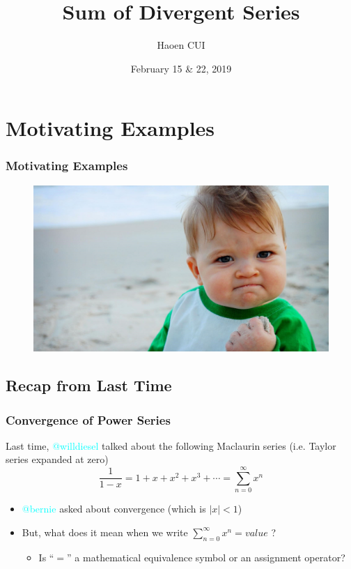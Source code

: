 \documentclass{beamer}
\title[Sum of Divergent Series]{Sum of Divergent Series} %
\author{Haoen CUI} %
\institute[Uptake] %
{
Uptake Math Club Lightning Talk
}
\date{February 15 \& 22, 2019}
\begin{document}
\begin{frame}
\titlepage %
\end{frame}


\section{Motivating Examples} 

\begin{frame}
\frametitle{Motivating Examples} 
\begin{figure}
\includegraphics[width=\linewidth]{success_kid.jpg}
\end{figure}
\end{frame}


\subsection{Recap from Last Time} 

\begin{frame}
\frametitle{Convergence of Power Series}

Last time, \textcolor{cyan}{@willdiesel} talked about the following Maclaurin series (i.e. Taylor series expanded at zero)
$$ \frac{1}{1-x} = 1 + x + x^2 + x^3 + \cdots = \sum_{n=0}^{\infty} x^n $$

\begin{itemize}
    \item \textcolor{cyan}{@bernie} asked about \alert{convergence} (which is $ |x| < 1 $) 
    \item But, what does it mean when we write $ \sum_{n=0}^{\infty} x^n = \textit{value} $ ?
    \begin{itemize}
        \item Is ``$=$'' a mathematical equivalence symbol or an assignment operator? 
    \end{itemize}
\end{itemize}

\end{frame}
\end{document}
